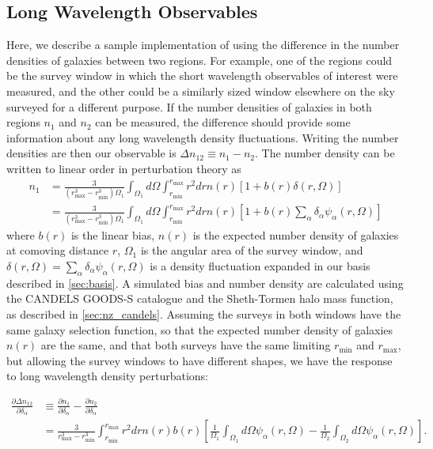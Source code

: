 \documentclass[a4paper,11pt]{article}
\begin{document}
\subsection{Long Wavelength Observables}
\label{ssec:lw_observables}
Here, we describe a sample implementation of using the difference in the number densities of galaxies between two regions. For example, one of the regions could be the survey window in which the short wavelength observables of interest were measured, and the other could be a similarly sized window elsewhere on the sky surveyed for a different purpose. If the number densities of galaxies in both regions $n_1$ and $n_2$ can be measured, the difference should provide some information about any long wavelength density fluctuations. Writing the number densities are  then our observable is $\Delta n_{12}\equiv n_1-n_2$.  The number density can be written to linear order in perturbation theory as
\begin{align}\label{number_density}
n_1 &= \frac{3}{(r_\text{max}^3-r_\text{min}^3)\Omega_1}\int_{\Omega_1}d\Omega\int_{r_\text{min}}^{r_\text{max}}r^2 dr n(r)\left[1+b(r)\delta(r,\Omega)\right]\\
&= \frac{3}{(r_\text{max}^3-r_\text{min}^3)\Omega_1}\int_{\Omega_1}d\Omega\int_{r_\text{min}}^{r_\text{max}}r^2 dr n(r)\left[1+b(r)\sum_\alpha{\delta_\alpha\psi_\alpha(r,\Omega)}\right]
\end{align}
where $b(r)$ is the linear bias, $n(r)$ is the expected number density of galaxies at comoving distance $r$, $\Omega_1$ is the angular area of the survey window, and $\delta(r,\Omega)=\sum_\alpha{\delta_\alpha\psi_\alpha(r,\Omega)}$ is a density fluctuation expanded in our basis described in \ref{sec:basis}. A simulated bias and number density are calculated using the CANDELS GOODS-S catalogue and the Sheth-Tormen halo mass function, as described in \ref{sec:nz_candels}.
Assuming the surveys in both windows have the same galaxy selection function, so that the expected number density of galaxies $n(r)$ are the same, and that both surveys have the same limiting $r_\text{min}$ and $r_\text{max}$, but allowing the survey windows to have different shapes, we have the response to long wavelength density perturbations:

\begin{align}\label{number_density_response}
\frac{\partial \Delta n_{12}}{\partial \delta_\alpha}&\equiv \frac{\partial n_1}{\partial \delta_\alpha}-\frac{\partial n_2}{\partial \delta_\alpha} \\
&=  \frac{3}{r_\text{max}^3-r_\text{min}^3}\int_{r_\text{min}}^{r_\text{max}}r^2 dr n(r)b(r)\left[\frac{1}{\Omega_1}\int_{\Omega_1}d\Omega \psi_{\alpha}(r,\Omega)-\frac{1}{\Omega_2}\int_{\Omega_2}d\Omega\psi_{\alpha}(r,\Omega)\right].
\end{align}
\end{document}
